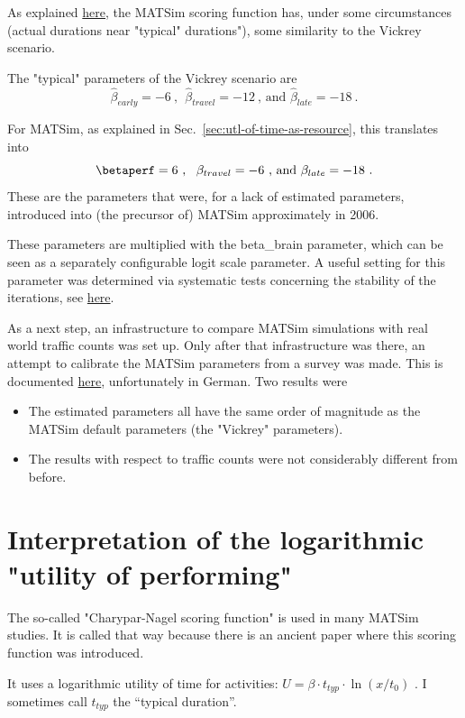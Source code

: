 As explained \href{http://matsim.org/node/650}{here},  the MATSim scoring function has, under some circumstances (actual  durations near "typical" durations"), some similarity to the Vickrey  scenario.

The "typical" parameters of the Vickrey scenario are 
\[
\hat\beta_{early}=-6~,~~\hat\beta_{travel}=-12~\mbox{, and } \hat\beta_{late}=-18 \ .
\]

For MATSim, as explained in Sec.~\ref{sec:utl-of-time-as-resource}, %
this translates into
\[
\betaperf=6~,~~\beta_{travel}=-6\mbox{ , and } \beta_{late}=-18 \ . 
\]
These are the parameters that were, for a lack of  estimated parameters, introduced into (the precursor of) MATSim  approximately in 2006.

These parameters are multiplied with the beta\_brain parameter, which  can be seen as a separately configurable logit scale parameter. A  useful setting for this parameter was determined via systematic tests  concerning the stability of the iterations, see \href{https://svn.vsp.tu-berlin.de/repos/public-svn/publications/vspwp/2004/04-03/}{here}.

As a next step, an infrastructure to compare MATSim simulations with  real world traffic counts was set up. Only after that  infrastructure was there, an attempt to calibrate the MATSim parameters  from a survey was made. This is documented \href{https://svn.vsp.tu-berlin.de/repos/public-svn/publications/vspwp/2009/09-10/}{here}, unfortunately in German. Two results were
\begin{itemize}
	\item The estimated parameters all have the same order of magnitude as the MATSim default parameters (the "Vickrey" parameters).
	\item The results with respect to traffic counts were not considerably different from before.
\end{itemize}



\section{Interpretation of the logarithmic "utility of performing"}

The  so-called "Charypar-Nagel scoring function" is used in many  MATSim  studies. It is called that way because there is an ancient paper   where this scoring function was introduced.

It uses a logarithmic utility of time for activities: $U = \beta \cdot t_{typ} \cdot  \ln(x/t_0)$ . I sometimes call $t_{typ}$ the ``typical duration''.

